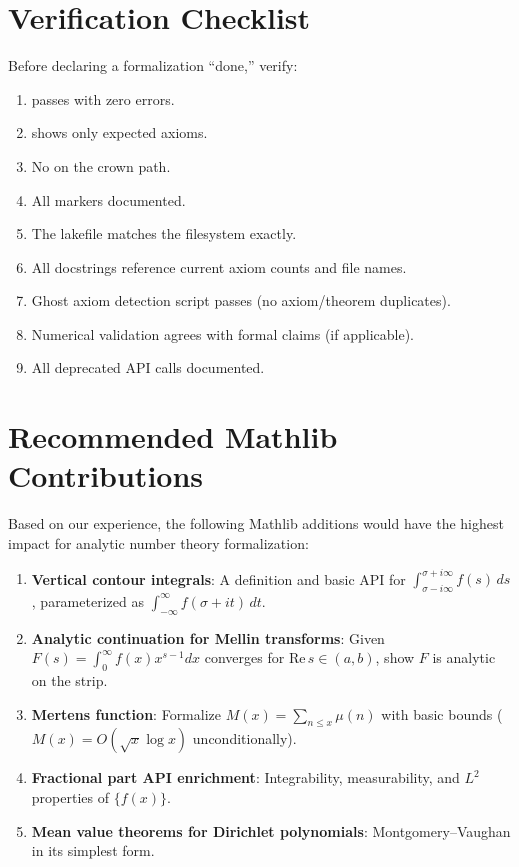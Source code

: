 \documentclass[11pt,a4paper]{article}
\begin{document}
\section{Verification Checklist}
\label{sec:checklist}

Before declaring a formalization ``done,'' verify:

\begin{enumerate}
  \item[$\square$]  passes with zero errors.
  \item[$\square$]  shows only
    expected axioms.
  \item[$\square$] No  on the crown path.
  \item[$\square$] All  markers documented.
  \item[$\square$] The lakefile matches the filesystem exactly.
  \item[$\square$] All docstrings reference current axiom counts
    and file names.
  \item[$\square$] Ghost axiom detection script passes (no axiom/theorem
    duplicates).
  \item[$\square$] Numerical validation agrees with formal claims (if
    applicable).
  \item[$\square$] All deprecated API calls documented.
\end{enumerate}

\section{Recommended Mathlib Contributions}
\label{sec:contributions}

Based on our experience, the following Mathlib additions would have
the highest impact for analytic number theory formalization:

\begin{enumerate}
  \item \textbf{Vertical contour integrals}: A definition and basic
    API for $\int_{\sigma-i\infty}^{\sigma+i\infty} f(s)\,ds$,
    parameterized as $\int_{-\infty}^{\infty} f(\sigma+it)\,dt$.
  \item \textbf{Analytic continuation for Mellin transforms}: Given
    $F(s) = \int_0^\infty f(x)x^{s-1}dx$ converges for
    $\mathrm{Re}\,s \in (a,b)$, show $F$ is analytic on the strip.
  \item \textbf{Mertens function}: Formalize $M(x) = \sum_{n \leq x}
    \mu(n)$ with basic bounds ($M(x) = O(\sqrt{x}\log x)$
    unconditionally).
  \item \textbf{Fractional part API enrichment}: Integrability,
    measurability, and $L^2$ properties of $\{f(x)\}$.
  \item \textbf{Mean value theorems for Dirichlet polynomials}:
    Montgomery--Vaughan in its simplest form.
\end{enumerate}
\end{document}
